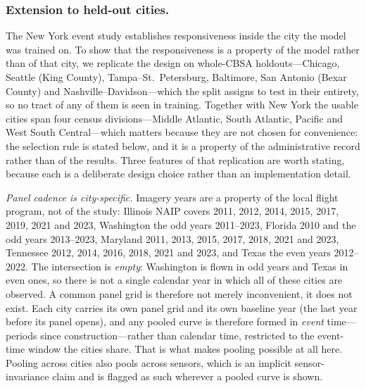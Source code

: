 \documentclass[conference]{IEEEtran}
\begin{document}


\subsubsection{Extension to held-out cities.}\label{sec:csa_multicity}
The New York event study establishes responsiveness inside the city the model was
trained on. To show that the responsiveness is a property of the model rather than
of that city, we replicate the design on whole-CBSA holdouts---Chicago, Seattle
(King County), Tampa--St.\ Petersburg, Baltimore, San Antonio (Bexar County) and
Nashville--Davidson---which the split assigns to test in their entirety, so no
tract of any of them is seen in training. Together with New York the usable cities
span four census divisions---Middle Atlantic, South Atlantic, Pacific and West
South Central---which matters because they are not chosen for convenience: the
selection rule is stated below, and it is a property of the administrative record
rather than of the results.
Three features of that replication are worth stating, because each is a deliberate
design choice rather than an implementation detail.

\emph{Panel cadence is city-specific.} Imagery years are a property of the local
flight program, not of the study: Illinois NAIP covers 2011, 2012, 2014, 2015,
2017, 2019, 2021 and 2023, Washington the odd years 2011--2023, Florida 2010 and
the odd years 2013--2023, Maryland 2011, 2013, 2015, 2017, 2018, 2021 and 2023,
Tennessee 2012, 2014, 2016, 2018, 2021 and 2023, and Texas the even years
2012--2022. The intersection is \emph{empty}: Washington is flown in odd years
and Texas in even ones, so there is not a single calendar year in which all of
these cities are observed. A common panel grid is therefore not merely
inconvenient, it does not exist. Each city carries its own panel
grid and its own baseline year (the last year before its panel opens), and any
pooled curve is therefore formed in \emph{event} time---periods since
construction---rather than calendar time, restricted to the event-time window the
cities share. That is what makes pooling possible at all here. Pooling
across cities also pools across sensors, which is an implicit
sensor-invariance claim and is flagged as such wherever a pooled curve is shown.
\end{document}
